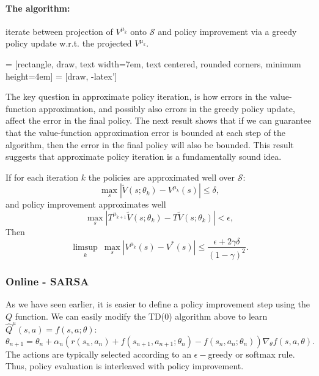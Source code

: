 \paragraph{The algorithm:} iterate between projection of $V^{\mu_k}$ onto $\mathcal{S}$ and policy improvement via a greedy policy update w.r.t. the projected $V^{\mu_k}$.

\vspace{20pt}
 = [rectangle, draw,
    text width=7em, text centered, rounded corners, minimum height=4em]
 = [draw, -latex']
\vspace{20pt}

The key question in approximate policy iteration, is how errors in the value-function approximation, and possibly also errors in the greedy policy update, affect the error in the final policy. The next result shows that if we can guarantee that the value-function approximation error is bounded at each step of the algorithm, then the error in the final policy will also be bounded. This result suggests that approximate policy iteration is a fundamentally sound idea.

\begin{theorem}\label{thm:API}
If for each iteration $k$ the policies are approximated well over $\mathcal{S}$:
$$\max_s |\tilde{V}(s;\theta_k)-V^{\mu_k}(s)| \le \delta,$$
and policy improvement approximates well
$$ \max_s |T^{\mu_{k+1}}\tilde{V}(s;\theta_k) - T\tilde{V}(s;\theta_k)| < \epsilon,$$
Then
$$ \limsup_k \ \max_s | V^{\mu_k}(s)-V^*(s)| \le \frac{\epsilon+2\gamma\delta}{(1-\gamma)^2}.$$
\end{theorem}

\subsubsection{Online - SARSA}
As we have seen earlier, it is easier to define a policy improvement step using the $Q$ function. We can easily modify the TD(0) algorithm above to learn $\hat{Q}^\mu(s,a) = f(s,a;\theta)$:
\begin{equation*}
    \theta_{n+1} = \theta_n + \alpha_n \left( r(s_n,a_n) + f(s_{n+1},a_{n+1};\theta_n) - f(s_{n},a_{n}; \theta_n) \right) \nabla_{\theta} f(s,a,\theta).
\end{equation*}
The actions are typically selected according to an $\epsilon-$greedy or softmax rule. Thus, policy evaluation is interleaved with policy improvement.

